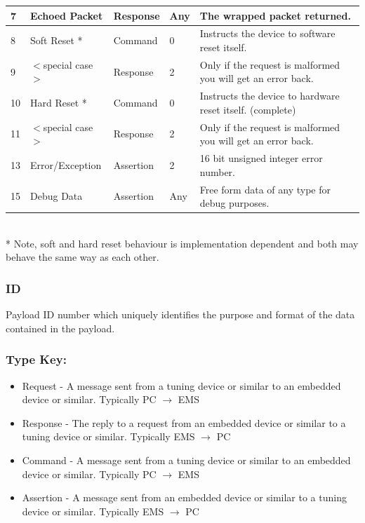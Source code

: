 \documentclass[12pt,a4paper,titlepage]{article}
\begin{document}
\begin{titlepage}
\begin{center}
\begin{tabular}{|l|p{2cm}|l|l|p{7cm}|}
\hline 7        & Echoed Packet & Response & Any & The wrapped packet returned.\\
\hline 8        & Soft Reset * & Command & 0 & Instructs the device to software reset itself.\\
\hline 9        & $<$special case$>$ & Response & 2 & Only if the request is malformed you will get an error back.\\
\hline 10       & Hard Reset * & Command & 0 & Instructs the device to hardware reset itself. (complete)\\
\hline 11       & $<$special case$>$ & Response & 2 & Only if the request is malformed you will get an error back.\\
\hline 13       & Error/Exception & Assertion & 2 & 16 bit unsigned integer error number.\\
\hline 15       & Debug Data & Assertion & Any & Free form data of any type for debug purposes.\\
\hline
\end{tabular}\\
* Note, soft and hard reset behaviour is implementation
dependent and both may behave the same way as each other.
\normalsize


\subsubsection*{ID}
Payload ID number which uniquely identifies the purpose and format of the data
contained in the payload.

\subsubsection*{Type Key:}
\begin{itemize}
\item Request - A message sent from a tuning device or similar to an embedded
device or similar. Typically PC $\rightarrow$ EMS
\item Response - The reply to a request from an embedded device or similar to a
tuning device or similar. Typically EMS $\rightarrow$ PC
\item Command - A message sent from a tuning device or similar to an embedded
device or similar. Typically PC $\rightarrow$ EMS
\item Assertion - A message sent from an embedded device or similar to a tuning
device or similar. Typically EMS $\rightarrow$ PC
\end{itemize}


\end{center}
\end{titlepage}
\end{document}
